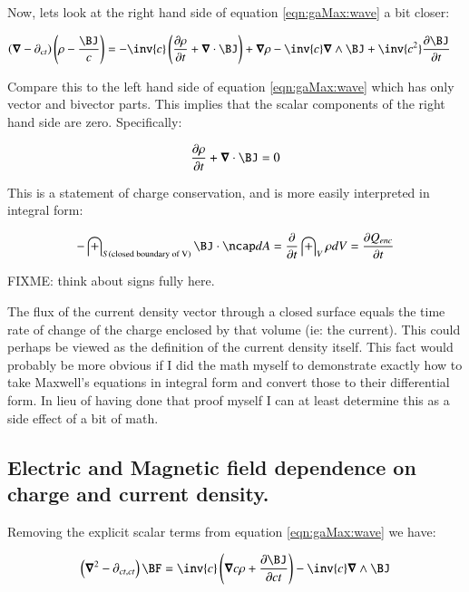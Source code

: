 Now, lets look at the right hand side of equation \ref{eqn:gaMax:wave} a bit closer:

\begin{align*}
\left(\spacegrad -\partial_{ct} \right) \left(\rho - \frac{\BJ}{c}\right) 
&= - \inv{c}\left(\frac{\partial \rho}{\partial t} + \spacegrad \cdot \BJ \right) + \spacegrad \rho - \inv{c}\spacegrad \wedge \BJ + \inv{c^2}\frac{\partial \BJ}{\partial t}
\end{align*}

Compare this to the left hand side of equation \ref{eqn:gaMax:wave} which has only vector and bivector parts.  This implies that the scalar components of the right hand side are zero.  Specifically:

\begin{equation*}
\frac{\partial \rho}{\partial t} + \spacegrad \cdot \BJ = 0
\end{equation*}

This is a statement of charge conservation, and is more easily interpreted in integral form:

\begin{equation}
-\int_{S(\text{closed boundary of V})} \BJ \cdot \ncap dA = \frac{\partial}{\partial t} \int_V \rho dV = \frac{\partial Q_{enc}}{\partial t}
\end{equation}

FIXME: think about signs fully here.

The flux of the current density vector through a closed surface equals the time rate of change of the charge enclosed by that volume (ie: the current).  This could perhaps be viewed as the definition of the current density itself.  This fact would probably be more obvious if I did the math myself to demonstrate exactly how to take Maxwell's equations in integral form and convert those to their differential form.  In lieu of having done that proof myself I can at least determine this as a side effect of a bit of math.

\subsection{Electric and Magnetic field dependence on charge and current density. }

Removing the explicit scalar terms from equation \ref{eqn:gaMax:wave} we have:

\begin{equation*}
\left(\spacegrad^2 - \partial_{ct, ct}\right) \BF =
\inv{c } \left(\spacegrad c \rho + \frac{\partial \BJ}{\partial c t} \right)
- \inv{c } \spacegrad \wedge \BJ
\end{equation*}

